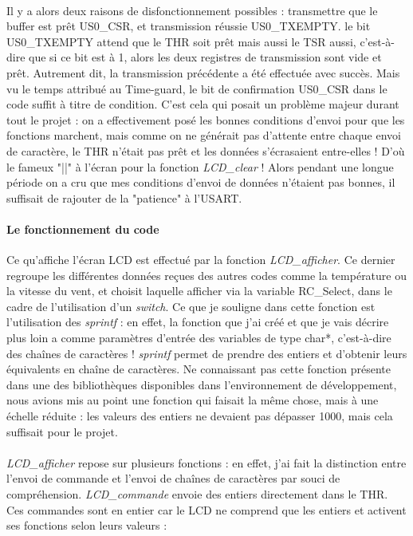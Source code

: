 \documentclass[a4paper]{report}
\begin{document}
				\paragraph{}
					Il y a alors deux raisons de disfonctionnement possibles : transmettre que le buffer est prêt US0\_CSR, et transmission réussie US0\_TXEMPTY. le bit US0\_TXEMPTY attend que le THR soit prêt mais aussi le TSR aussi, c'est-à-dire que si ce bit est à 1, alors les deux registres de transmission sont vide et prêt. Autrement dit, la transmission précédente a été effectuée avec succès. Mais vu le temps attribué au Time-guard, le bit de confirmation US0\_CSR dans le code suffit à titre de condition. C'est cela qui posait un problème majeur durant tout le projet : on a effectivement posé les bonnes conditions d'envoi pour que les fonctions marchent, mais comme on ne générait pas d'attente entre chaque envoi de caractère, le THR n'était pas prêt et les données s'écrasaient entre-elles ! D'où le fameux "||" à l'écran pour la fonction \emph{LCD\_clear} ! Alors pendant une longue période on a cru que mes conditions d'envoi de données n'étaient pas bonnes, il suffisait de rajouter de la "patience" à l'USART.

			\paragraph{Le fonctionnement du code}
				Ce qu'affiche l'écran LCD est effectué par la fonction \emph{LCD\_afficher}. Ce dernier regroupe les différentes données reçues des autres codes comme la température ou la vitesse du vent, et choisit laquelle afficher via la variable RC\_Select, dans le cadre de l'utilisation d'un \emph{switch}. Ce que je souligne dans cette fonction est l'utilisation des \emph{sprintf} : en effet, la fonction que j'ai créé et que je vais décrire plus loin a comme paramètres d'entrée des variables de type char*, c'est-à-dire des chaînes de caractères ! \emph{sprintf} permet de prendre des entiers et d'obtenir leurs équivalents en chaîne de caractères. Ne connaissant pas cette fonction présente dans une des bibliothèques disponibles dans l'environnement de développement, nous avions mis au point une fonction qui faisait la même chose, mais à une échelle réduite : les valeurs des entiers ne devaient pas dépasser 1000, mais cela suffisait pour le projet.

			\paragraph{}
				\emph{LCD\_afficher} repose sur plusieurs fonctions : en effet, j'ai fait la distinction entre l'envoi de commande et l'envoi de chaînes de caractères par souci de compréhension. \emph{LCD\_commande} envoie des entiers directement dans le THR. Ces commandes sont en entier car le LCD ne comprend que les entiers et activent ses fonctions selon leurs valeurs :
\end{document}
